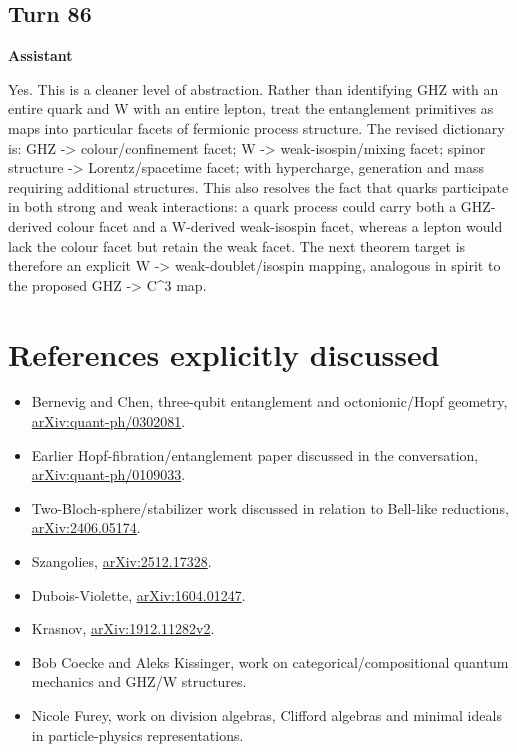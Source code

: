 \documentclass[11pt,a4paper]{article}
\newcommand{\speaker}[1]{\par\medskip\noindent\textbf{\large #1}\par\smallskip}
\begin{document}
\subsection*{Turn 86}
\speaker{Assistant}
Yes. This is a cleaner level of abstraction. Rather than identifying GHZ with an entire quark and W with an entire lepton, treat the entanglement primitives as maps into particular facets of fermionic process structure. The revised dictionary is: GHZ -> colour/confinement facet; W -> weak-isospin/mixing facet; spinor structure -> Lorentz/spacetime facet; with hypercharge, generation and mass requiring additional structures. This also resolves the fact that quarks participate in both strong and weak interactions: a quark process could carry both a GHZ-derived colour facet and a W-derived weak-isospin facet, whereas a lepton would lack the colour facet but retain the weak facet. The next theorem target is therefore an explicit W -> weak-doublet/isospin mapping, analogous in spirit to the proposed GHZ -> C\textasciicircum{}3 map.

\section{References explicitly discussed}
\begin{itemize}[leftmargin=*]
\item Bernevig and Chen, three-qubit entanglement and octonionic/Hopf geometry, \href{https://arxiv.org/abs/quant-ph/0302081}{arXiv:quant-ph/0302081}.
\item Earlier Hopf-fibration/entanglement paper discussed in the conversation, \href{https://arxiv.org/abs/quant-ph/0109033}{arXiv:quant-ph/0109033}.
\item Two-Bloch-sphere/stabilizer work discussed in relation to Bell-like reductions, \href{https://arxiv.org/abs/2406.05174}{arXiv:2406.05174}.
\item Szangolies, \href{https://arxiv.org/abs/2512.17328}{arXiv:2512.17328}.
\item Dubois-Violette, \href{https://arxiv.org/abs/1604.01247}{arXiv:1604.01247}.
\item Krasnov, \href{https://arxiv.org/abs/1912.11282v2}{arXiv:1912.11282v2}.
\item Bob Coecke and Aleks Kissinger, work on categorical/compositional quantum mechanics and GHZ/W structures.
\item Nicole Furey, work on division algebras, Clifford algebras and minimal ideals in particle-physics representations.
\end{itemize}
\end{document}
